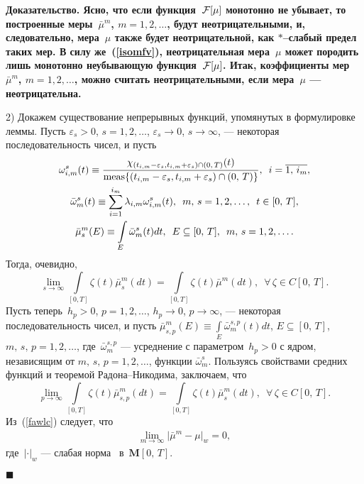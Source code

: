 \documentclass{report}
\newenvironment{Proof}{\par\noindent\bf Доказательство.\rm}{ $\blacksquare$\par}
\newcommand{\meas}{\mathop{\rm meas}\nolimits}
\begin{document}
\begin{Proof}
Ясно, что если функция~${\cal F}[\mu]$ монотонно не убывает, то построенные меры~$\bar\mu^m$, $m=1,2,\dots$, будут неотрицательными, и, следовательно, мера~$\mu$ также будет
неотрицательной, как $*$--слабый предел таких мер. В силу же~(\ref{isomfv}), неотрицательная мера~$\mu$ может породить лишь монотонно неубывающую функция~${\cal F}[\mu]$. Итак, коэффициенты
мер~$\bar\mu^m$, $m=1,2,\dots$, можно считать неотрицательными, если мера~$\mu$ --- неотрицательна.

2) Докажем существование непрерывных функций, упомянутых в формулировке леммы. Пусть $\varepsilon_s>0$, $s=1,2,\dots$, $\varepsilon_s\to0$, $s\to\infty$, --- некоторая последовательность
чисел, и пусть
\begin{gather*}
\omega^s_{i,m}(t)\equiv \frac{\chi_{(t_{i,m}-\varepsilon_s,t_{i,m}+\varepsilon_s)\cap(0,\,T)}(t)}{\meas\{(t_{i,m}-\varepsilon_s,t_{i,m}+\varepsilon_s)\cap(0,\,T)\}},\,\,\,
i=\overline{1,\,i_m},\\
\bar{\omega}^s_m(t)\equiv\sum\limits_{i=1}^{i_m}\lambda_{i,m}\omega^s_{i,m}(t),\,\,\,m,\,s=1,2,\dots,\,\,\,t\in[0,\,T],\\
\bar{\mu}_s^m(E)\equiv\int\limits_E\bar{\omega}^s_m(t)dt,\,\,\, E\subseteq[0,\,T],\,\,\,m,\,s=1,2,\dots.
\end{gather*}
Тогда, очевидно,
\begin{equation}\label{sawlc}
\lim\limits_{s\to\infty}\int\limits_{[0,T]}\zeta(t)\bar{\mu}^m_s(dt)= \int\limits_{[0,T]}\zeta(t)\bar{\mu}^m(dt),\,\,\,\forall\,\zeta\in C[0,\,T].
\end{equation}
Пусть теперь~$h_p>0$, $p=1,2,\dots$, $h_p\to0$, $p\to\infty$, --- некоторая последовательность чисел, и пусть $\displaystyle\bar{\mu}^m_{s,p}(E)\equiv \int\limits_E\bar{\omega}^{s,p}_m(t)
dt$, $E\subseteq[0,\,T]$, $m,\,s,\,p=1,2,\dots$, где~$\bar{\omega}^{s,p}_m$ --- усреднение с параметром~$h_p>0$ с ядром, независящим от $m,\,s,\,p=1,2,\dots$, функции $\bar{\omega}^{s}_m$.
Пользуясь свойствами средних функций и теоремой Радона--Никодима, заключаем, что
\begin{equation}\label{tawlc}
\lim\limits_{p\to\infty}\int\limits_{[0,T]}\zeta(t)\bar{\mu}^m_{s,p}(dt)= \int\limits_{[0,T]}\zeta(t)\bar{\mu}^m_s(dt),\,\,\,\forall\,\zeta\in C[0,\,T].
\end{equation}
Из~(\ref{fawlc}) следует, что
\begin{gather}\label{weaknc:m}
\lim\limits_{m\to\infty}|\bar{\mu}^m-\mu|_w=0,
\end{gather}
где~$|\cdot|_w$ --- слабая норма~\cite{warga} в~$\mathbf{M}[0,\,T]$.


\end{Proof}
\end{document}
